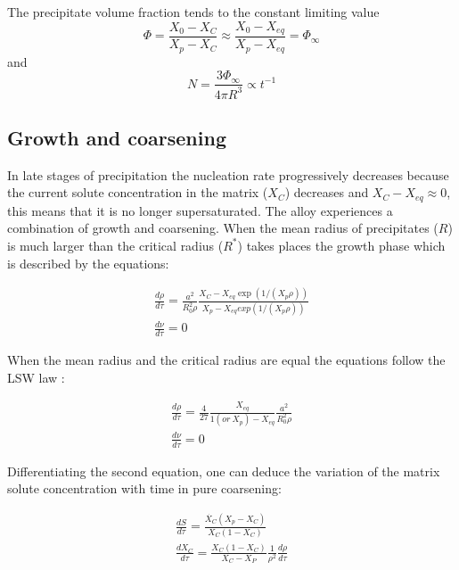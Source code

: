 \documentclass[12pt,a4paper]{article}
\begin{document}
The precipitate volume fraction tends to the constant limiting value
\begin{equation}
\Phi = \frac{X_0 - X_{C}}{X_p-X_C} \approx \frac{X_0 - X_{eq}}{X_p-X_{eq}} = \Phi_\infty
\end{equation}
and
\begin{equation}
N = \frac{3\Phi_\infty}{4\pi R^3} \propto t^{-1}
\end{equation}


\subsection{Growth and coarsening}
In late stages of precipitation the nucleation rate progressively decreases because the current solute concentration in the matrix ($X_C$) decreases and $X_C - X_{eq} \approx 0$, this means that it is no longer supersaturated. The alloy experiences a combination of growth and coarsening. When the mean radius of precipitates ($R$) is much larger than the critical radius ($R^*$) takes places the growth phase which is described by the equations:

\begin{subequations}
		\begin{align}
 \frac{d\rho}{d\tau} = \frac{a^2}{R_0^2 \rho}\frac{X_C -X_{eq}\exp(1/(X_p\rho))}{X_p - X_{eq}exp(1/(X_p\rho))}  \\
 \frac{d\nu}{d\tau} = 0 
 	\end{align} 
\end{subequations}

When the mean radius and the critical radius are equal the equations follow the LSW law :

\begin{subequations}
	\begin{align}
	\frac{d\rho}{d\tau} = \frac{4}{27}\frac{X_{eq}}{1 (or~X_p) - X_{eq}} \frac{a^2}{R_0^2 \rho} \\
	\frac{d\nu}{d\tau} = 0 
	\end{align} 
\end{subequations}

Differentiating the second equation, one can deduce the variation of the matrix solute concentration with time in pure coarsening:

\begin{subequations}
	\begin{align}
	\frac{dS}{d\tau} = \frac{\dot{X_C}(X_p - X_C)}{X_C(1-X_C)} \\
	\frac{dX_C}{d\tau} = \frac{X_C(1-X_C)}{X_C-X_P} \frac{1}{\rho^2} \frac{d\rho}{d\tau}
	\end{align} 
\end{subequations}
\end{document}
